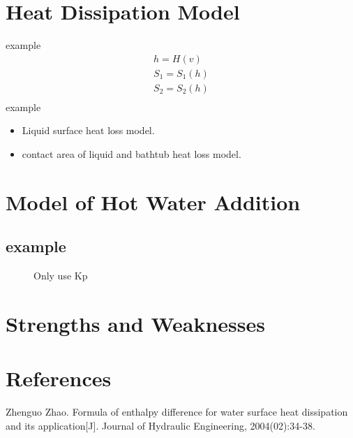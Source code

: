 \documentclass{mcmthesis}
\newcommand{\upcite}[1]{\textsuperscript{\textsuperscript{\cite{#1}}}}
\begin{document}
\section{Heat Dissipation Model}
example
\begin{equation}
\begin{split}
h=H(v)  \\
S_{1}=S_{1}(h) \\
S_{2}=S_{2}(h)  \\
\end{split}
\end{equation}
\indent example\\
\begin{itemize}
\item{Liquid surface heat loss model.\\ }
\item{contact area of liquid and bathtub heat loss model.\\ }
\end{itemize}



\section{Model of Hot Water Addition}

\subsection{example}
 
\begin{figure}[H]
\centering
{}
\caption{Only use Kp\upcite{test}}
\label{PID1}
\end{figure}



\section{Strengths and Weaknesses}



\section{References}
\begin{thebibliography}{99}
Zhenguo Zhao. Formula of enthalpy difference for water surface heat dissipation and its application[J]. Journal of Hydraulic Engineering, 2004(02):34-38.

\end{thebibliography}
\end{document}
